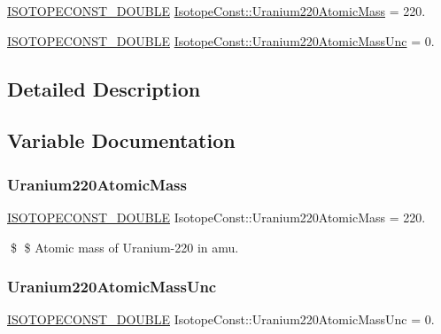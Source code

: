\begin{DoxyCompactItemize}
\item 
\mbox{\hyperlink{group___isotope_const-_macros_ga8f45a7272ce02c0b4c65c44636ed719a}{I\+S\+O\+T\+O\+P\+E\+C\+O\+N\+S\+T\+\_\+\+D\+O\+U\+B\+LE}} \mbox{\hyperlink{group___isotope_const-_uranium-_u220_gaf2f6becf2473d8ecf816d0991d47498e}{Isotope\+Const\+::\+Uranium220\+Atomic\+Mass}} = 220.
\item 
\mbox{\hyperlink{group___isotope_const-_macros_ga8f45a7272ce02c0b4c65c44636ed719a}{I\+S\+O\+T\+O\+P\+E\+C\+O\+N\+S\+T\+\_\+\+D\+O\+U\+B\+LE}} \mbox{\hyperlink{group___isotope_const-_uranium-_u220_ga8411f3624e4b92abb2a42eaf15764fa6}{Isotope\+Const\+::\+Uranium220\+Atomic\+Mass\+Unc}} = 0.
\end{DoxyCompactItemize}


\subsection{Detailed Description}


\subsection{Variable Documentation}
\mbox{\label{group___isotope_const-_uranium-_u220_gaf2f6becf2473d8ecf816d0991d47498e}} 
\subsubsection{\texorpdfstring{Uranium220\+Atomic\+Mass}{Uranium220AtomicMass}}
{\footnotesize\ttfamily \mbox{\hyperlink{group___isotope_const-_macros_ga8f45a7272ce02c0b4c65c44636ed719a}{I\+S\+O\+T\+O\+P\+E\+C\+O\+N\+S\+T\+\_\+\+D\+O\+U\+B\+LE}} Isotope\+Const\+::\+Uranium220\+Atomic\+Mass = 220.}

\$ \$ Atomic mass of Uranium-\/220 in amu. \mbox{\label{group___isotope_const-_uranium-_u220_ga8411f3624e4b92abb2a42eaf15764fa6}} 
\subsubsection{\texorpdfstring{Uranium220\+Atomic\+Mass\+Unc}{Uranium220AtomicMassUnc}}
{\footnotesize\ttfamily \mbox{\hyperlink{group___isotope_const-_macros_ga8f45a7272ce02c0b4c65c44636ed719a}{I\+S\+O\+T\+O\+P\+E\+C\+O\+N\+S\+T\+\_\+\+D\+O\+U\+B\+LE}} Isotope\+Const\+::\+Uranium220\+Atomic\+Mass\+Unc = 0.}


